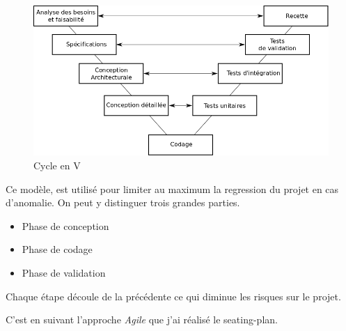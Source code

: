 \documentclass{report}
\begin{document}
\begin{figure}[H]
	\centering
	\includegraphics[width=1\textwidth]{assets/cycle_en_v.png}
\caption{Cycle en V}
\end{figure}
Ce modèle, est utilisé pour limiter au maximum la regression du projet en cas d'anomalie.  
On peut y distinguer trois grandes parties. 
\begin{itemize}
	\item Phase de conception
	\item Phase de codage 
	\item Phase de validation 
\end{itemize}
Chaque étape découle de la précédente ce qui diminue les risques sur le projet. 

C'est en suivant l'approche \emph{Agile} que j'ai réalisé le seating-plan.

\newpage
\end{document}

